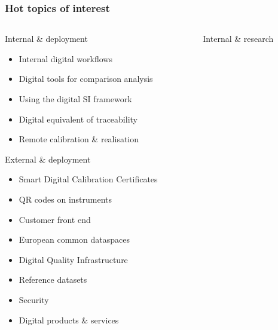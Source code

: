 \documentclass{beamer}
\newcommand{\highlight}[1]{{\color{red} #1}}
\begin{document}
    \begin{frame}
        \frametitle{Hot topics of interest}
        \begin{columns}%
            \begin{column}{0.45\textwidth}
                \begin{block}{Internal \& deployment}
                    \scriptsize
                    \begin{itemize}
                        \item \highlight{Internal digital workflows}
                        \item \highlight{Digital tools for comparison analysis}
                        \item Using the digital SI framework
                        \item Digital equivalent of traceability
                        \item Remote calibration \& realisation
                    \end{itemize}
                \end{block}
                \begin{block}{External \& deployment}
                    \scriptsize
                    \begin{itemize}
                        \item \highlight{Smart Digital Calibration Certificates}
                        \item QR codes on instruments
                        \item Customer front end
                        \item \highlight{European common dataspaces}
                        \item Digital Quality Infrastructure
                        \item Reference datasets
                        \item Security
                        \item Digital products \& services
                    \end{itemize}
                \end{block}
            \end{column}
            \begin{column}{0.45\textwidth}
                \begin{block}{Internal \& research}
                    \scriptsize
                    \begin{itemize}

\end{itemize}
\end{block}
\end{column}
\end{columns}
\end{frame}
\end{document}
